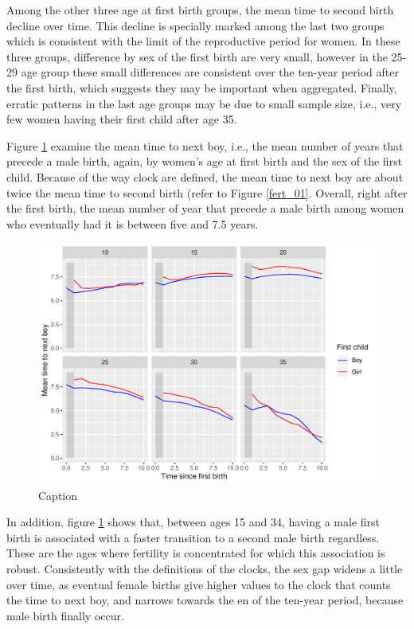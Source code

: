 \documentclass{article}
\begin{document}
Among the other three age at first birth groups, the mean time to second birth decline over time. This decline is specially marked among the last two groups which is consistent with the limit of the reproductive period for women. In these three groups, difference by sex of the first birth are very small, however in the 25-29 age group these small differences are consistent over the ten-year period after the first birth, which suggests they may be important when aggregated. Finally, erratic patterns in the last age groups may be due to small sample size, i.e., very few women having their first child after age 35.

Figure \ref{fert_02} examine the mean time to next boy, i.e., the mean number of years that precede a male birth, again, by women's age at first birth and the sex of the first child. Because of the way clock are defined, the mean time to next boy are about twice the mean time to second birth (refer to Figure \ref{fert_01}. Overall, right after the first birth, the mean number of year that precede a male birth among women who eventually had it is between five and 7.5 years.

\begin{figure}[H]
    \centering
    \includegraphics{Spells/Figures/mt_second_boy_by_sex_first.pdf}
    \caption{Caption}
    \label{fert_02}
\end{figure}

In addition, figure \ref{fert_02} shows that, between ages 15 and 34, having a male first birth is associated with a faster transition to a second male birth regardless. These are the ages where fertility is concentrated for which this association is robust. Consistently with the definitions of the clocks, the sex gap widens a little over time, as eventual female births give higher values to the clock that counts the time to next boy, and narrows towards the en of the ten-year period, because male birth finally occur. 
\end{document}
